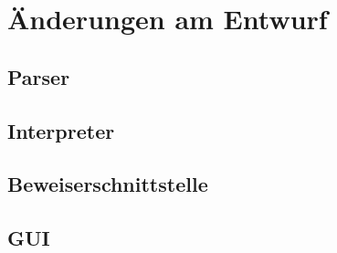 \section{Änderungen am Entwurf}
\subsection{Parser}
\subsection{Interpreter}
\subsection{Beweiserschnittstelle}
\subsection{GUI}
